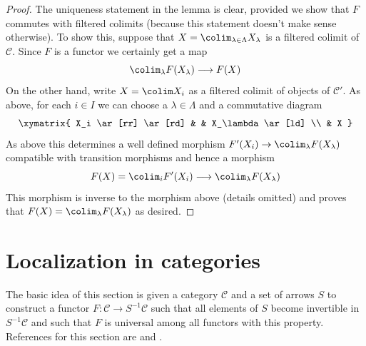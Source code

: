 \begin{proof}
\medskip\noindent
The uniqueness statement in the lemma is clear, provided
we show that $F$ commutes with filtered colimits (because this
statement doesn't make sense otherwise). To show this, suppose that
$X = \colim_{\lambda \in \Lambda} X_\lambda$
is a filtered colimit of $\mathcal{C}$. Since $F$ is a functor
we certainly get a map
$$
\colim_\lambda F(X_\lambda) \longrightarrow F(X)
$$
On the other hand, write $X = \colim X_i$
as a filtered colimit of objects of $\mathcal{C}'$.
As above, for each $i \in I$ we can choose a $\lambda \in \Lambda$
and a commutative diagram
$$
\xymatrix{
X_i \ar[rr] \ar[rd] & & X_\lambda \ar[ld] \\
& X
}
$$
As above this determines a well defined morphism
$F'(X_i) \to \colim_\lambda F(X_\lambda)$ compatible
with transition morphisms and hence a morphism
$$
F(X) = \colim_i F'(X_i) \longrightarrow \colim_\lambda F(X_\lambda)
$$
This morphism is inverse to the morphism above (details omitted)
and proves that $F(X) = \colim_\lambda F(X_\lambda)$ as desired.
\end{proof}







\section{Localization in categories}
\label{section-localization}

\noindent
The basic idea of this section is given a category $\mathcal{C}$
and a set of arrows $S$ to construct a functor
$F : \mathcal{C} \to S^{-1}\mathcal{C}$
such that all elements of $S$ become invertible in $S^{-1}\mathcal{C}$
and such that $F$ is universal among all functors with this property.
References for this section are \cite[Chapter I, Section 2]{GZ}
and \cite[Chapter II, Section 2]{Verdier}.

